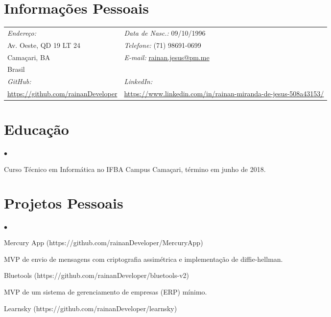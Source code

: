 \documentclass[margin,line]{res}
\newenvironment{list2}{
 \begin{list}{$\bullet$}{%
     \setlength{\itemsep}{0in}
     \setlength{\parsep}{0in} \setlength{\parskip}{0in}
     \setlength{\topsep}{0in} \setlength{\partopsep}{0in}
     \setlength{\leftmargin}{0.2in}}}{\end{list}}
\begin{document}
\vspace{0.2cm}
\begin{resume}
\section{Informações Pessoais}
\vspace{.05in}
\begin{tabular}{@{}p{2.5in}p{3.5in}}
{\it Endereço: }                   & {\it Data de Nasc.:}  09/10/1996 \\
Av. Oeste, QD 19 LT 24 & {\it Telefone:}  (71) 98691-0699 \\
Camaçari, BA            & {\it E-mail:}  \href{mailto:rainan.jesus@pm.me}{rainan.jesus@pm.me}\\
Brasil                      & {\it }\\
{\it GitHub:}  & {\it LinkedIn:} \\
\href{https://github.com/rainanDeveloper}{https://github.com/rainanDeveloper} & \href{https://www.linkedin.com/in/rainan-miranda-de-jesus-508a43153/}{https://www.linkedin.com/in/rainan-miranda-de-jesus-508a43153/}
\end{tabular}
\vspace{0.2cm}
\section{Educação}
\begin{list2}

\item Curso Técnico em Informática no IFBA Campus Camaçari, término em junho de 2018.
\end{list2}
\section{Projetos Pessoais}
\begin{list2}
\item Mercury App (https://github.com/rainanDeveloper/MercuryApp)

    MVP de envio de mensagens com criptografia assimétrica e implementação de diffie-hellman.
\item Bluetools (https://github.com/rainanDeveloper/bluetools-v2)

    MVP de um sistema de gerenciamento de empresas (ERP) mínimo.
\item Learnsky (https://github.com/rainanDeveloper/learnsky)


\end{list2}
\end{resume}
\end{document}
